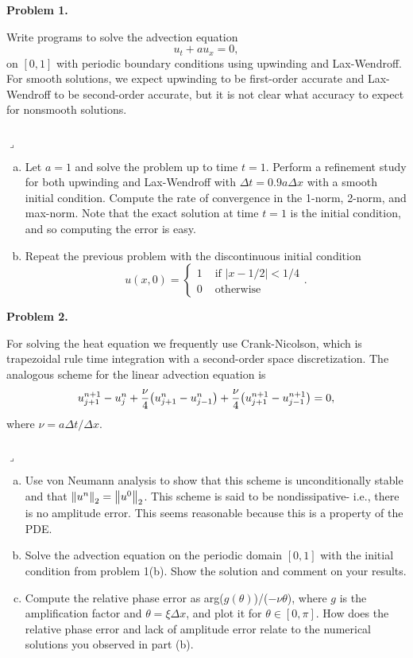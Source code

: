 \documentclass[12pt]{article}
\newenvironment{myprob}[1]
    {%
    \noindent{\Huge$\ulcorner$}\textbf{#1.}\begin{em}
    }
    { 
    \end{em} \\ \hphantom{l} \hfill {\Huge$\lrcorner$} }
\begin{document}
\rhead{\today}

{\let\newpage\relax} 


\begin{myprob}{Problem 1}
Write programs to solve the advection equation
$$u_t + au_x = 0, $$
on $[0,1]$ with periodic boundary conditions using upwinding and Lax-Wendroff.  For smooth solutions, we expect upwinding to be first-order accurate and Lax-Wendroff to be second-order accurate, but it is not clear what accuracy to expect for nonsmooth solutions.
\end{myprob}
\begin{enumerate}[(a)]
\item Let $a=1$ and solve the problem up to time $t=1$.  Perform a refinement study for both upwinding and Lax-Wendroff with $\Delta t=0.9a\Delta x$ with a smooth initial condition.  Compute the rate of convergence in the 1-norm, 2-norm, and max-norm.  Note that the exact solution at time $t=1$ is the initial condition, and so computing the error is easy.


\item Repeat the previous problem with the discontinuous initial condition
$$u(x,0) = \begin{cases}1 & \text{ if } |x-1/2|<1/4 \\ 0 & \text{ otherwise } \end{cases}.$$


\end{enumerate}

\begin{myprob}{Problem 2}
For solving the heat equation we frequently use Crank-Nicolson, which is trapezoidal rule time integration with a second-order space discretization.  The analogous scheme for the linear advection equation is
$$u_{j+1}^{n+1} - u_{j}^{n} + \dfrac{\nu}{4}\qty(u_{j+1}^{n}-u_{j-1}^{n}) + \dfrac{\nu}{4}\qty(u_{j+1}^{n+1}-u_{j-1}^{n+1}) =0,$$
where $\nu = a\Delta t/\Delta x$.
\end{myprob}
\begin{enumerate}[(a)]
\item Use von Neumann analysis to show that this scheme is unconditionally stable and that $\norm{u^n}_2 = \norm{u^0}_2$.  This scheme is said to be nondissipative- i.e., there is no amplitude error.  This seems reasonable because this is a property of the PDE.

\item Solve the advection equation on the periodic domain $[0,1]$ with the initial condition from problem 1(b).  Show the solution and comment on your results.

\item Compute the relative phase error as arg($g(\theta)$)/($-\nu\theta$), where $g$ is the amplification factor and $\theta = \xi\Delta x$, and plot it for $\theta\in[0,\pi]$.  How does the relative phase error and lack of amplitude error relate to the numerical solutions you observed in part (b).
\end{enumerate}
\end{document}
